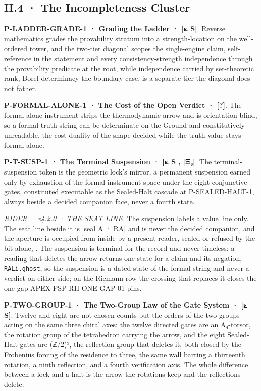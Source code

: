 \documentclass[10pt,twocolumn]{article}
\begin{document}
\hypertarget{ii.4-the-incompleteness-cluster}{%
\subsection{II.4 · The Incompleteness
Cluster}\label{ii.4-the-incompleteness-cluster}}

\textbf{P-LADDER-GRADE-1 · Grading the Ladder · {[}⟀ S{]}}. Reverse
mathematics grades the provability stratum into a strength-location on
the well-ordered tower, and the two-tier diagonal scopes the
single-engine claim, self-reference in the statement and every
consistency-strength independence through the provability predicate at
the root, while independence carried by set-theoretic rank, Borel
determinacy the boundary case, is a separate tier the diagonal does not
father.

\textbf{P-FORMAL-ALONE-1 · The Cost of the Open Verdict · {[}?{]}}. The
formal-alone instrument strips the thermodynamic arrow and is
orientation-blind, so a formal truth-string can be determinate on the
Ground and constitutively unreadable, the cost duality of the shape
decided while the truth-value stays formal-alone.

\textbf{P-T-SUSP-1 · The Terminal Suspension · {[}⟀ S{]}, {[}Ξ₀{]}}. The
terminal-suspension token is the geometric lock's mirror, a permanent
suspension earned only by exhaustion of the formal instrument space
under the eight conjunctive gates, constituted executable as the
Sealed-Halt cascade at P-SEALED-HALT-1, always beside a decided
companion face, never a fourth state.

\emph{RIDER · v4.2.0 · THE SEAT LINE.} The suspension labels a value
line only. The seat line beside it is {[}seal A · RA{]} and is never the
decided companion, and the aperture is occupied from inside by a present
reader, sealed or refused by the bit alone,
\texttt{}. The suspension is
terminal for the record and never timeless: a reading that deletes the
arrow returns one state for a claim and its negation,
\texttt{RALi.ghost}, so the suspension is a dated state of the formal
string and never a verdict on either side; on the Riemann row the
crossing that replaces it closes the one gap APEX-PSP-RH-ONE-GAP-01
pins.

\textbf{P-TWO-GROUP-1 · The Two-Group Law of the Gate System · {[}⟀
S{]}}. Twelve and eight are not chosen counts but the orders of the two
groups acting on the same three chiral axes: the twelve directed gates
are an A₄-torsor, the rotation group of the tetrahedron carrying the
arrow, and the eight Sealed-Halt gates are (ℤ/2)³, the reflection group
that deletes it, both closed by the Frobenius forcing of the residence
to three, the same wall barring a thirteenth rotation, a ninth
reflection, and a fourth verification axis. The whole difference between
a lock and a halt is the arrow the rotations keep and the reflections
delete.
\end{document}
